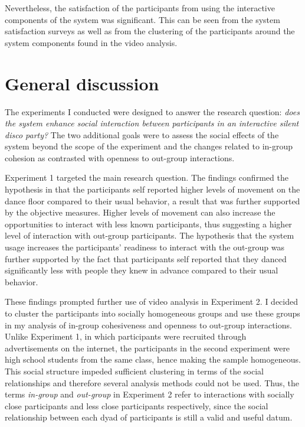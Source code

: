 \documentclass[a4paper,11pt]{article}
\newcommand{\definition}[1]{\emph{#1}}
\begin{document}
{Nevertheless, the satisfaction of the participants from using the interactive components of the system was significant.
This can be seen from the system satisfaction surveys as well as from the clustering of the participants around the system components found in the video analysis.

\section{General discussion}

The experiments I conducted were designed to answer the research question: \emph{does the system enhance social interaction between participants in an interactive silent disco party?}
The two additional goals were to assess the social effects of the system beyond the scope of the experiment and the changes related to in-group cohesion as contrasted with openness to out-group interactions.

Experiment 1 targeted the main research question.
The findings confirmed the hypothesis in that the participants self reported higher levels of movement on the dance floor compared to their usual behavior, a result that was further supported by the objective measures.
Higher levels of movement can also increase the opportunities to interact with less known participants, thus suggesting a higher level of interaction with out-group participants.
The hypothesis that the system usage increases the participants' readiness to interact with the out-group was further supported by the fact that participants self reported that they danced significantly less with people they knew in advance compared to their usual behavior.

These findings prompted further use of video analysis in Experiment 2.
I decided to cluster the participants into socially homogeneous groups and use these groups in my analysis of in-group cohesiveness and openness to out-group interactions.
Unlike Experiment 1, in which participants were recruited through advertisements on the internet, the participants in the second experiment were high school students from the same class, hence making the sample homogeneous.
This social structure impeded sufficient clustering in terms of the social relationships and therefore several analysis methods could not be used.
Thus, the terms \definition{in-group} and \definition{out-group} in Experiment 2 refer to interactions with socially close participants and less close participants respectively, since the social relationship between each dyad of participants is still a valid and useful datum.

}
\end{document}
